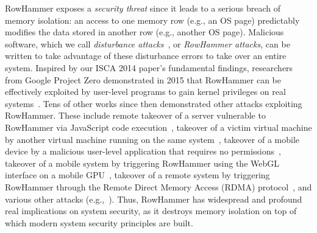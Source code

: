 \documentclass[runningheads]{llncs}
\begin{document}
RowHammer exposes a {\em security threat} since it leads to a serious
breach of memory isolation: an access to one memory row (e.g., an OS
page) predictably modifies the data stored in another row (e.g.,
another OS page). Malicious software, which we call {\em disturbance
  attacks}~\cite{rowhammer-isca2014}, or {\em RowHammer attacks}, can
be written to take advantage of these disturbance errors to take over
an entire system. Inspired by our ISCA 2014 paper's fundamental
findings, researchers from Google Project Zero demonstrated in 2015
that RowHammer can be effectively exploited by user-level programs to
gain kernel privileges on real
systems~\cite{google-project-zero,google-rh-blackhat}. Tens of other
works since then demonstrated other attacks exploiting
RowHammer. These include remote takeover of a server vulnerable to
RowHammer via JavaScript code execution~\cite{rowhammer-js}, takeover
of a victim virtual machine by another virtual machine running on the
same system~\cite{flip-feng-shui}, takeover of a mobile device by a
malicious user-level application that requires no
permissions~\cite{drammer}, takeover of a mobile system by triggering
RowHammer using the WebGL interface on a mobile GPU~\cite{glitch-vu},
takeover of a remote system by triggering RowHammer through the Remote
Direct Memory Access (RDMA) protocol~\cite{throwhammer,nethammer}, and
various other attacks
(e.g.,~\cite{cloudflops,dedup-est-machina,anotherflip,qiao2016new,bhattacharya2016curious,jang2017sgx,poddebniak2018attacking,aga2017good,tatar2018defeating,pessl2016drama}). Thus,
RowHammer has widespread and profound real implications on system
security, as it destroys memory isolation on top of which modern
system security principles are built.



 

\end{document}
